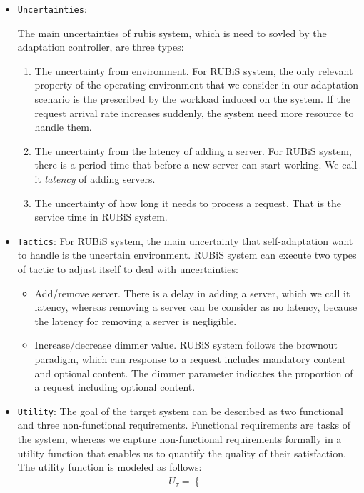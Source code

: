 \documentclass[sigconf]{acmart}
\begin{document}
\begin{itemize}
	\item {\verb|Uncertainties|}:
	
	The main uncertainties of rubis system, which is need to sovled by the adaptation controller, are three types:
	\begin{enumerate}
		\item The uncertainty from environment. For RUBiS system, the only relevant property of the operating environment that we consider in our adaptation scenario is the  prescribed by the workload induced on the system. If the request arrival rate increases suddenly, the system need more resource to handle them.
		\item The uncertainty from the latency of adding a server. For RUBiS system, there is a period time that before a new server can start working. We call it \textit{latency} of adding servers. 
		\item The uncertainty of how long it needs to process a request. That is the service time in RUBiS system.
	\end{enumerate}
	\item {\verb|Tactics|}: 
	For RUBiS system, the main uncertainty that self-adaptation want to handle is the uncertain environment. RUBiS system can execute two types of tactic to adjust itself to deal with uncertainties:
	\begin{itemize}
		\item Add/remove server. There is a delay in adding a server, which we call it latency, whereas removing a server can be consider as no latency, because the latency for removing a server is negligible.
		\item Increase/decrease dimmer value. RUBiS system follows the brownout paradigm\cite{brownout}, which can response to a request includes mandatory content and optional content. The dimmer parameter indicates the proportion of a request including optional content.
	\end{itemize}
	\item {\verb|Utility|}:
	The goal of the target system can be described as two functional and three non-functional requirements. Functional requirements are tasks of the system, whereas we capture non-functional requirements formally in a utility function that enables us to quantify the quality of their satisfaction. The utility function is modeled as follows:
	\begin{equation}
	\begin{aligned}
	U_{\tau}=\left\{
	\begin{array}{rcl}

\end{array}
\end{aligned}
\end{equation}
\end{itemize}
\end{document}
